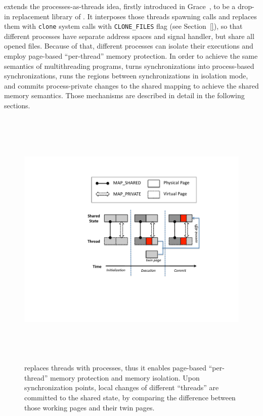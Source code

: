 \label{sec:sheriffframework}


%

\sheriff{} extends the processes-as-threads idea, firstly introduced in Grace~\cite{grace}, to be a drop-in replacement library of \pthreads{}. It interposes those threads spawning calls and replaces them with \texttt{clone} system calls with \texttt{CLONE\_FILES} flag (see Section~\ref{}), so that different processes have separate address spaces and signal handler, but share all opened files. Because of that, different processes can isolate their executions and employ page-based ``per-thread'' memory protection. In order to achieve the same semantics of multithreading programs, \sheriff{} turns synchronizations into process-based synchronizations, runs the regions between synchronizations in isolation mode, and commits process-private changes to the shared mapping to achieve the shared memory semantics. Those mechanisms are described in detail in the following sections. 

\begin{figure}[!h]
\centering
\includegraphics[height=5in]{sheriff/figure/sheriffframework.pdf}
\caption{
\Sheriff{} replaces threads with processes, thus it enables page-based ``per-thread'' memory protection and memory isolation. Upon synchronization points, local changes of different ``threads'' are committed to the shared state, by comparing the difference between those working pages and their twin pages. \label{fig:overview}}
\end{figure}

